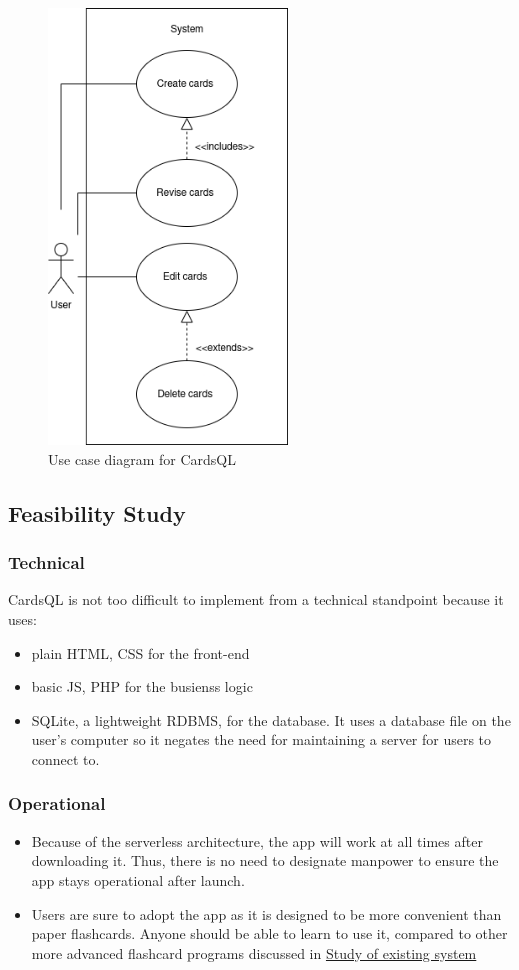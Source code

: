 \documentclass[a4paper]{article}
\begin{document}
\begin{enumerate}
\begin{figure}[htbp]
\centering
\includegraphics[width=240px]{diagrams/use-case-diagram.png}
\caption{Use case diagram for CardsQL}
\end{figure}
\end{enumerate}

\subsection{Feasibility Study}
\label{sec:orgff5cf65}
\subsubsection{Technical}
\label{sec:org14e30ca}
CardsQL is not too difficult to implement from a technical standpoint because it uses:

\begin{itemize}
\item plain HTML, CSS for the front-end
\item basic JS, PHP for the busienss logic
\item SQLite, a lightweight RDBMS, for the database. It uses a database file on the user's computer so it negates the need for maintaining a server for users to connect to.
\end{itemize}
\subsubsection{Operational}
\label{sec:org59bf688}
\begin{itemize}
\item Because of the serverless architecture, the app will work at all times after downloading it. Thus, there is no need to designate manpower to ensure the app stays operational after launch.
\item Users are sure to adopt the app as it is designed to be more convenient than paper flashcards. Anyone should be able to learn to use it, compared to other more advanced flashcard programs discussed in \hyperref[sec:org0ed27fb]{Study of existing system}
\end{itemize}
\end{document}
